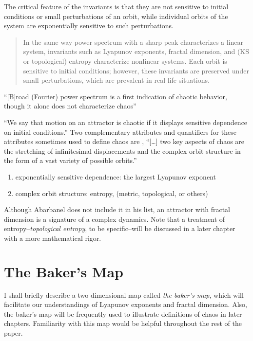 \documentclass[12pt,twoside]{book}
\begin{document}
The critical feature of the invariants is that they are not sensitive to initial conditions
or small perturbations of an orbit, while individual orbits of the system are exponentially
sensitive to such perturbations. \citep[p.1334]{abarbanel}

\begin{quote}
In the same way power spectrum with a sharp peak characterizes a linear system, invariants such as Lyapunov exponents, fractal dimension, and (KS or topological) entropy characterize nonlinear systems.
Each orbit is sensitive to initial conditions; however, these invariants are preserved under small perturbations, which are prevalent in real-life situations.
\end{quote}

``[B]road (Fourier) power spectrum is a first indication of chaotic behavior, though it alone does not characterize chaos''\citep[p.1338]{abarbanel}

``We say that motion on an attractor is chaotic if it displays sensitive dependence on initial conditions.'' \citep[p.11]{ott1994}
Two complementary attributes and quantifiers for these attributes sometimes used to define chaos are \citep[p.379]{abarbanel}, %
``[\ldots] two key aspects of chaos are the stretching of infinitesimal displacements and the complex orbit structure in the form of a vast variety of possible orbits.'' \citep[p.31]{ott1994}
\begin{enumerate}
  \item exponentially sensitive dependence: the largest Lyapunov exponent 
  \item complex orbit structure: entropy, (metric, topological, or others)
\end{enumerate}

Although Abarbanel does not include it in his list, an attractor with fractal dimension is a signature of a complex dynamics.
Note that a treatment of entropy--\textit{topological entropy}, to be specific--will be discussed in a later chapter with a more mathematical rigor.

\section{The Baker's Map}
I shall briefly describe a two-dimensional map called \textit{the baker's map}, which will facilitate our understandings of Lyapunov exponents and fractal dimension.
Also, the baker's map will be frequently used to illustrate definitions of chaos in later chapters.
Familiarity with this map would be helpful throughout the rest of the paper.
\end{document}
